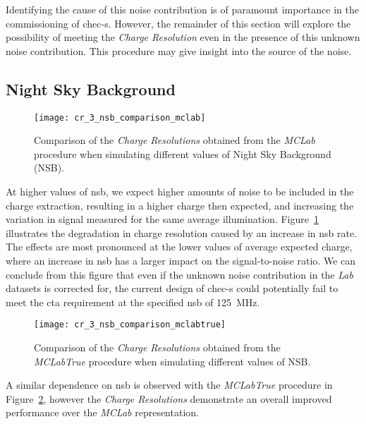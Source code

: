 Identifying the cause of this noise contribution is of paramount importance in the commissioning of \gls{chec-s}. However, the remainder of this section will explore the possibility of meeting the \textit{Charge Resolution} even in the presence of this unknown noise contribution. This procedure may give insight into the source of the noise.

\subsection{Night Sky Background}

\begin{figure}[H]
	\centering
    \texttt{[image: cr\_3\_nsb\_comparison\_mclab]} 
	\caption[Comparison of the \textit{Charge Resolution} at different NSBs.]{Comparison of the \textit{Charge Resolutions} obtained from the \textit{MCLab} procedure when simulating different values of Night Sky Background (NSB).}
	\label{fig:cr_3_nsb_comparison_mclab}
\end{figure}

At higher values of \gls{nsb}, we expect higher amounts of noise to be included in the charge extraction, resulting in a higher charge then expected, and increasing the variation in signal measured for the same average illumination. Figure~\ref{fig:cr_3_nsb_comparison_mclab} illustrates the degradation in charge resolution caused by an increase in \gls{nsb} rate. The effects are most pronounced at the lower values of average expected charge, where an increase in \gls{nsb} has a larger impact on the signal-to-noise ratio. We can conclude from this figure that even if the unknown noise contribution in the \textit{Lab} datasets is corrected for, the current design of \gls{chec-s} could potentially fail to meet the \gls{cta} requirement at the specified \gls{nsb} of \SI{125}{MHz}.

\begin{figure}
	\centering
    \texttt{[image: cr\_3\_nsb\_comparison\_mclabtrue]} 
	\caption[Comparison of the \textit{Charge Resolution} at different NSBs using the \textit{MCLabTrue} procedure.]{Comparison of the \textit{Charge Resolutions} obtained from the \textit{MCLabTrue} procedure when simulating different values of NSB.}
	\label{fig:cr_3_nsb_comparison_mclabtrue}
\end{figure}

A similar dependence on \gls{nsb} is observed with the \textit{MCLabTrue} procedure in Figure~\ref{fig:cr_3_nsb_comparison_mclabtrue}, however the \textit{Charge Resolutions} demonstrate an overall improved performance over the \textit{MCLab} representation.

